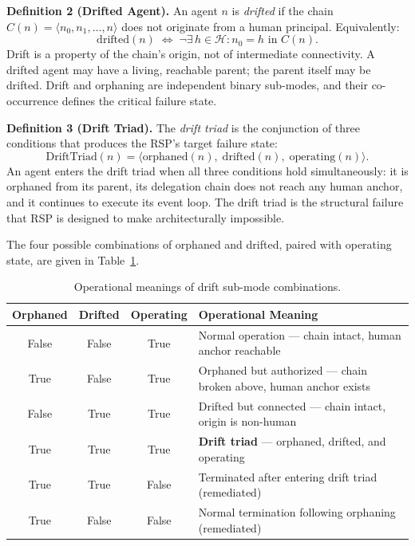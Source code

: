 \medskip
\noindent\textbf{Definition 2 (Drifted Agent).}
An agent $n$ is \emph{drifted} if the chain $C(n) = \langle n_0, n_1, \ldots, n \rangle$ does not originate from a human principal. Equivalently:
\begin{equation}
\mathrm{drifted}(n) \;\iff\; \neg\exists\, h \in \mathcal{H} : n_0 = h \text{ in } C(n).
\label{eq:drifted-def}
\end{equation}
Drift is a property of the chain's origin, not of intermediate connectivity. A drifted agent may have a living, reachable parent; the parent itself may be drifted. Drift and orphaning are independent binary sub-modes, and their co-occurrence defines the critical failure state.

\medskip
\noindent\textbf{Definition 3 (Drift Triad).}
The \emph{drift triad} is the conjunction of three conditions that produces the RSP's target failure state:
\begin{equation}
\mathrm{DriftTriad}(n) = \langle \mathrm{orphaned}(n),\; \mathrm{drifted}(n),\; \mathrm{operating}(n) \rangle.
\label{eq:drift-triad}
\end{equation}
An agent enters the drift triad when all three conditions hold simultaneously: it is orphaned from its parent, its delegation chain does not reach any human anchor, and it continues to execute its event loop. The drift triad is the structural failure that RSP is designed to make architecturally impossible.

The four possible combinations of orphaned and drifted, paired with operating state, are given in Table~\ref{tab:drift-submodes}.

\begin{table}[h]
\centering
\begin{tabular}{c|c|c|p{5cm}}
\textbf{Orphaned} & \textbf{Drifted} & \textbf{Operating} & \textbf{Operational Meaning} \\ \hline
False & False & True  & Normal operation — chain intact, human anchor reachable \\
True  & False & True  & Orphaned but authorized — chain broken above, human anchor exists \\
False & True  & True  & Drifted but connected — chain intact, origin is non-human \\
True  & True  & True  & \textbf{Drift triad} — orphaned, drifted, and operating \\
True  & True  & False & Terminated after entering drift triad (remediated) \\
True  & False & False & Normal termination following orphaning (remediated)
\end{tabular}
\caption{Operational meanings of drift sub-mode combinations.}
\label{tab:drift-submodes}
\end{table}


